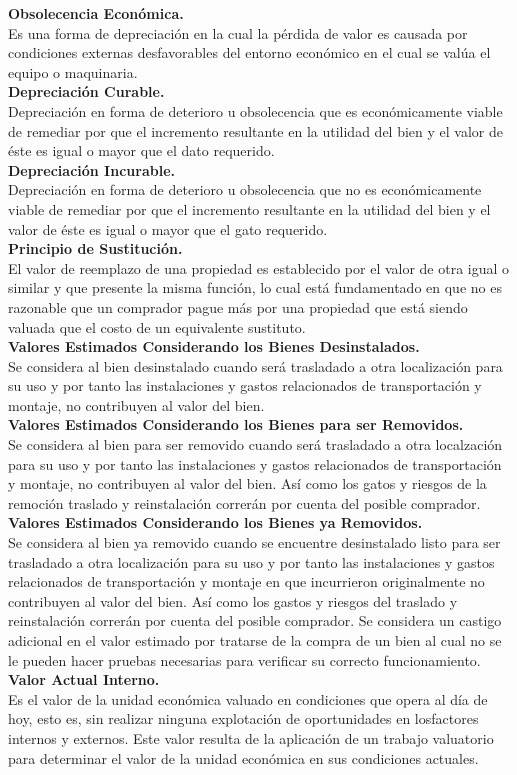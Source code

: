 \textbf{Obsolecencia Económica.} \\ 
Es una forma de depreciación en la cual la pérdida de valor es causada por condiciones externas desfavorables del entorno económico en el cual se valúa el equipo o maquinaria. \\[6mm] 
\textbf{Depreciación Curable.} \\ 
Depreciación en forma de deterioro u obsolecencia que es económicamente viable de remediar por que el incremento resultante en la utilidad del bien y el valor de éste es igual o mayor que el dato requerido. \\[6mm] 
\textbf{Depreciación Incurable.} \\ 
Depreciación en forma de deterioro u obsolecencia que no es económicamente viable de remediar por que el incremento resultante en la utilidad del bien y el valor de éste es igual o mayor que el gato requerido. \\[6mm] 
\textbf{Principio de Sustitución.} \\ 
El valor de reemplazo de una propiedad es establecido por el valor de otra igual o similar y que presente la misma función, lo cual está fundamentado en que no es razonable que un comprador pague más por una propiedad que está siendo valuada que el costo de un equivalente sustituto. \\[6mm] 
\textbf{Valores Estimados Considerando los Bienes Desinstalados.} \\ 
Se considera al bien desinstalado cuando será trasladado a otra localización para su uso y por tanto las instalaciones y gastos relacionados de transportación y montaje, no contribuyen al valor del bien. \\[6mm] 
\textbf{Valores Estimados Considerando los Bienes para ser Removidos.} \\ 
Se considera al bien para ser removido cuando será trasladado a otra localzación para su uso y por tanto las instalaciones y gastos relacionados de transportación y montaje, no contribuyen al valor del bien.
Así como los gatos y riesgos de la remoción traslado y reinstalación correrán por cuenta del posible comprador. \\[6mm] 
\textbf{Valores Estimados Considerando los Bienes ya Removidos.} \\ 
Se considera al bien ya removido cuando se encuentre desinstalado listo para ser trasladado a otra localización para su uso y por tanto las instalaciones y gastos relacionados de transportación y montaje en que incurrieron originalmente no contribuyen al valor del bien.
Así como los gastos y riesgos del traslado y reinstalación correrán por cuenta del posible comprador.
Se considera un castigo adicional en el valor estimado por tratarse de la compra de un bien al cual no se le pueden hacer pruebas necesarias para verificar su correcto funcionamiento. \\[6mm]
\textbf{Valor Actual Interno. } \\ 
Es el valor de la unidad económica valuado en condiciones que opera al día de hoy, esto es, sin realizar ninguna explotación de oportunidades en losfactores internos y externos. Este valor resulta de la aplicación de un trabajo valuatorio para determinar el valor de la unidad económica en sus condiciones actuales.

